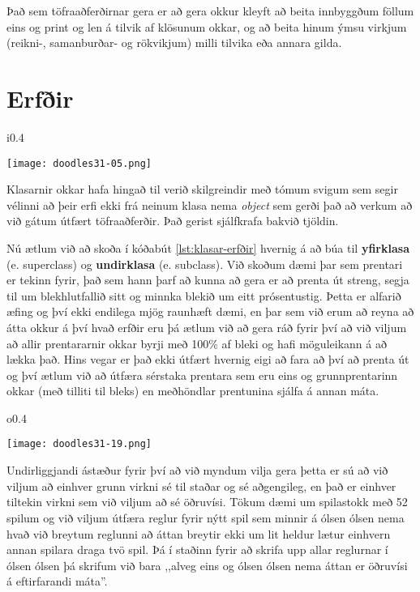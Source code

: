 Það sem töfraaðferðirnar gera er að gera okkur kleyft að beita innbyggðum föllum eins og print og len á tilvik af klösunum okkar, og að beita hinum ýmsu virkjum (reikni-, samanburðar- og rökvikjum) milli tilvika eða annara gilda.


\section{Erfðir}\label{uk:klasar-erfðir}
\begin{wrapfigure}{i}{0.4\textwidth} %
	\begin{center}
		\texttt{[image: doodles31-05.png]}
	\end{center}
\end{wrapfigure}
Klasarnir okkar hafa hingað til verið skilgreindir með tómum svigum sem segir vélinni að þeir erfi ekki frá neinum klasa nema \textit{object} sem gerði það að verkum að við gátum útfært töfraaðferðir.
Það gerist sjálfkrafa bakvið tjöldin.

Nú ætlum við að skoða í kóðabút \ref{lst:klasar-erfðir} hvernig á að búa til \textbf{yfirklasa} (e. superclass) og \textbf{undirklasa} (e. subclass).
Við skoðum dæmi þar sem prentari er tekinn fyrir, það sem hann þarf að kunna að gera er að prenta út streng, segja til um blekhlutfallið sitt og minnka blekið um eitt prósentustig.
Þetta er alfarið æfing og því ekki endilega mjög raunhæft dæmi, en þar sem við erum að reyna að átta okkur á því hvað erfðir eru þá ætlum við að gera ráð fyrir því að við viljum að allir prentararnir okkar byrji með 100\% af bleki og hafi möguleikann á að lækka það.
Hins vegar er það ekki útfært hvernig eigi að fara að því að prenta út og því ætlum við að útfæra sérstaka prentara sem eru eins og grunnprentarinn okkar (með tilliti til bleks) en meðhöndlar prentunina sjálfa á annan máta.
\begin{wrapfigure}{o}{0.4\textwidth} %
	\begin{center}
		\texttt{[image: doodles31-19.png]}
	\end{center}
\end{wrapfigure}

Undirliggjandi ástæður fyrir því að við myndum vilja gera þetta er sú að við viljum að einhver grunn virkni sé til staðar og sé aðgengileg, en það er einhver tiltekin virkni sem við viljum að sé öðruvísi.
Tökum dæmi um spilastokk með 52 spilum og við viljum útfæra reglur fyrir nýtt spil sem minnir á ólsen ólsen nema hvað við breytum reglunni að áttan breytir ekki um lit heldur lætur einhvern annan spilara draga tvö spil.
Þá í staðinn fyrir að skrifa upp allar reglurnar í ólsen ólsen þá skrifum við bara ,,alveg eins og ólsen ólsen nema áttan er öðruvísi á eftirfarandi máta''.

